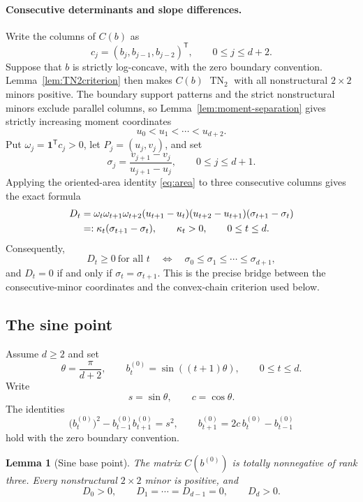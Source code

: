 \documentclass{amsart}
\numberwithin{equation}{section}
\newtheorem{lemma}[theorem]{Lemma}
\theoremstyle{definition}
\theoremstyle{remark}
\DeclareMathOperator{\TN}{TN}
\newcommand{\transpose}{\mathsf T}
\begin{document}
\paragraph{Consecutive determinants and slope differences.}
Write the columns of $C(b)$ as
\[
 c_j=(b_j,b_{j-1},b_{j-2})^{\transpose},
 \qquad 0\le j\le d+2.
\]
Suppose that $b$ is strictly log-concave, with the zero boundary convention.  Lemma~\ref{lem:TN2criterion} then makes $C(b)$ $\TN_2$ with all nonstructural $2\times2$ minors positive.  The boundary support patterns and the strict nonstructural minors exclude parallel columns, so Lemma~\ref{lem:moment-separation} gives strictly increasing moment coordinates
\[
 u_0<u_1<\cdots<u_{d+2}.
\]
Put $\omega_j=\mathbf1^{\transpose}c_j>0$, let $P_j=(u_j,v_j)$, and set
\[
 \sigma_j=\frac{v_{j+1}-v_j}{u_{j+1}-u_j},
 \qquad 0\le j\le d+1.
\]
Applying the oriented-area identity \eqref{eq:area} to three consecutive columns gives the exact formula
\begin{align}
 D_t
 &={}\omega_t\omega_{t+1}\omega_{t+2}
 (u_{t+1}-u_t)(u_{t+2}-u_{t+1})
 (\sigma_{t+1}-\sigma_t)\notag\\
 &=:\kappa_t(\sigma_{t+1}-\sigma_t),
 \qquad \kappa_t>0,
 \qquad 0\le t\le d.\label{eq:D-slope}
\end{align}
Consequently,
\[
 D_t\ge0\ \text{for all }t
 \quad\Longleftrightarrow\quad
 \sigma_0\le\sigma_1\le\cdots\le\sigma_{d+1},
\]
and $D_t=0$ if and only if $\sigma_t=\sigma_{t+1}$.  This is the precise bridge between the consecutive-minor coordinates and the convex-chain criterion used below.

\subsection*{The sine point}
Assume $d\ge2$ and set
\begin{equation}\label{eq:sinebase}
 \theta=\frac{\pi}{d+2},
 \qquad
 b_t^{(0)}=\sin((t+1)\theta),
 \qquad 0\le t\le d.
\end{equation}
Write
\begin{equation}\label{eq:sc}
 s=\sin\theta,
 \qquad c=\cos\theta.
\end{equation}
The identities
\begin{equation}\label{eq:sineidentities}
 \bigl(b_t^{(0)}\bigr)^2-b_{t-1}^{(0)}b_{t+1}^{(0)}=s^2,
 \qquad
 b_{t+1}^{(0)}=2c\,b_t^{(0)}-b_{t-1}^{(0)}
\end{equation}
hold with the zero boundary convention.

\begin{lemma}[Sine base point]\label{lem:sinebase}
The matrix $C(b^{(0)})$ is totally nonnegative of rank three.  Every nonstructural $2\times2$ minor is positive, and
\begin{equation}\label{eq:sineD}
 D_0>0,
 \qquad
 D_1=\cdots=D_{d-1}=0,
 \qquad
 D_d>0.
\end{equation}
\end{lemma}
\end{document}
